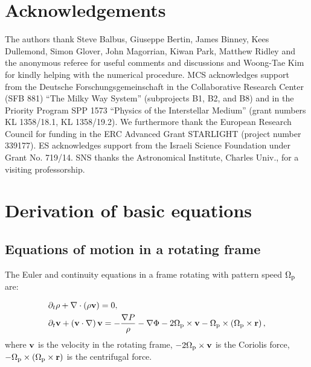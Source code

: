 \documentclass[useAMS,usenatbib]{mn2e}
\def\pa{\partial}
\begin{document}
\section*{Acknowledgements}
%
The authors thank Steve Balbus, Giuseppe Bertin, James Binney, Kees Dullemond, Simon Glover, John Magorrian, Kiwan Park, Matthew Ridley and the anonymous referee for useful comments and discussions and Woong-Tae Kim for kindly helping with the numerical procedure. MCS acknowledges support from the Deutsche Forschungsgemeinschaft in the Collaborative Research Center (SFB 881) ``The Milky Way System'' (subprojects B1, B2, and B8) and in the Priority Program SPP 1573 ``Physics of the Interstellar Medium'' (grant numbers KL 1358/18.1, KL 1358/19.2). We furthermore thank the European Research Council for funding in  the ERC Advanced Grant STARLIGHT (project number 339177). ES acknowledges support from the Israeli Science Foundation under Grant No. 719/14. SNS thanks the Astronomical Institute, Charles Univ., for a visiting professorship.

\def\aap{A\&A}\def\aj{AJ}\def\apj{ApJ}\def\mnras{MNRAS}\def\araa{ARA\&A}\def\aapr{Astronomy \&
  Astrophysics Review}\def\apjs{ApJS}



\appendix

\section{Derivation of basic equations} \label{appendix:correspondence}
%
\subsection{Equations of motion in a rotating frame}
%
The Euler and continuity equations in a frame rotating with pattern speed ${\Omega}_{\rm p}$ are:

\begin{align} 
	& \pa_t \rho + \nabla \cdot \left( \rho \bfv \right) = 0 , \label{eq:eom_1} \\
	& \pa_t \bfv + \left( \bfv \cdot \nabla \right) \bfv  = - \frac{\nabla P}{\rho} -\nabla \Phi - 2 \bfOmegap \times \bfv - \bfOmegap \times \left( \bfOmegap \times \bfr \right) , \label{eq:eom_2}
\end{align}
where $\mathbf{v}$ is the velocity in the rotating frame, $- 2 {\Omega}_{\rm p} \times \mathbf{v}$ is the Coriolis force, $ - {\Omega}_{\rm p} \times \left( {\Omega}_{\rm p} \times \mathbf{r} \right)$ is the centrifugal force.
\end{document}
